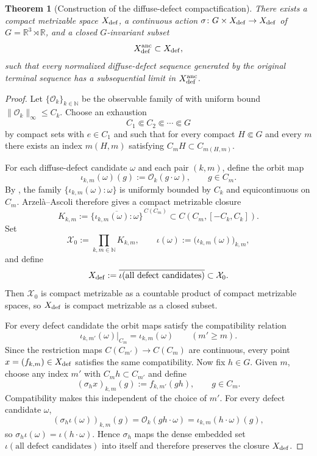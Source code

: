 \documentclass[11pt]{amsart}
\numberwithin{equation}{section}
\theoremstyle{plain}
\newtheorem{theorem}{Theorem}[section]
\theoremstyle{definition}
\theoremstyle{remark}
\begin{document}
\begin{theorem}[Construction of the diffuse-defect compactification]
\label{thm:diffuse-defect-compactification-construction}
There exists a compact metrizable space \(X_{\rm def}\), a continuous action
\(\sigma\colon G\times X_{\rm def}\to X_{\rm def}\) of
\(G=\mathbb R^3\rtimes\mathbb R\), and a closed \(G\)-invariant subset
\[
   X_{\rm def}^{\rm anc}\subset X_{\rm def} ,
\]
such that every normalized diffuse-defect sequence generated by the original
terminal sequence has a subsequential limit in \(X_{\rm def}^{\rm anc}\).
\end{theorem}

\begin{proof}
Let \(\{\mathcal O_k\}_{k\in\mathbb N}\) be the observable family of
 with uniform bound
\(\|\mathcal O_k\|_\infty\le C_k\).  Choose an exhaustion
\[
   C_1\Subset C_2\Subset\cdots\Subset G
\]
by compact sets with \(e\in C_1\) and such that for every compact
\(H\Subset G\) and every \(m\) there exists an index \(m(H,m)\) satisfying
\(C_mH\subset C_{m(H,m)}\).

For each diffuse-defect candidate \(\omega\) and each pair \((k,m)\), define
the orbit map
\[
   \iota_{k,m}(\omega)(g):=\mathcal O_k(g\cdot\omega),
   \qquad g\in C_m .
\]
By ,
the family \(\{\iota_{k,m}(\omega):\omega\}\) is uniformly bounded by \(C_k\)
and equicontinuous on \(C_m\).  Arzel\`a--Ascoli therefore gives a compact
metrizable closure
\[
   K_{k,m}:=\overline{\{\iota_{k,m}(\omega):\omega\}}^{\,C(C_m)}
   \subset C(C_m,[-C_k,C_k]).
\]
Set
\[
   \mathcal X_0:=\prod_{k,m\in\mathbb N}K_{k,m},
   \qquad
   \iota(\omega):=\bigl(\iota_{k,m}(\omega)\bigr)_{k,m},
\]
and define
\[
   X_{\rm def}:=\overline{\iota(\text{all defect candidates})}
   \subset \mathcal X_0 .
\]
Then \(\mathcal X_0\) is compact metrizable as a countable product of compact
metrizable spaces, so \(X_{\rm def}\) is compact metrizable as a closed subset.

For every defect candidate the orbit maps satisfy the compatibility relation
\[
   \iota_{k,m'}(\omega)|_{C_m}=\iota_{k,m}(\omega)
   \qquad (m'\ge m).
\]
Since the restriction maps \(C(C_{m'})\to C(C_m)\) are continuous, every point
\(x=(f_{k,m})\in X_{\rm def}\) satisfies the same compatibility.  Now fix
\(h\in G\).  Given \(m\), choose any index \(m'\) with \(C_mh\subset C_{m'}\)
and define
\[
   (\sigma_hx)_{k,m}(g):=f_{k,m'}(gh),
   \qquad g\in C_m .
\]
Compatibility makes this independent of the choice of \(m'\).  For every
defect candidate \(\omega\),
\[
   (\sigma_h\iota(\omega))_{k,m}(g)
   =\mathcal O_k(gh\cdot\omega)
   =\iota_{k,m}(h\cdot\omega)(g),
\]
so \(\sigma_h\iota(\omega)=\iota(h\cdot\omega)\).  Hence \(\sigma_h\) maps the
dense embedded set \(\iota(\text{all defect candidates})\) into itself and
therefore preserves the closure \(X_{\rm def}\).


\end{proof}
\end{document}
